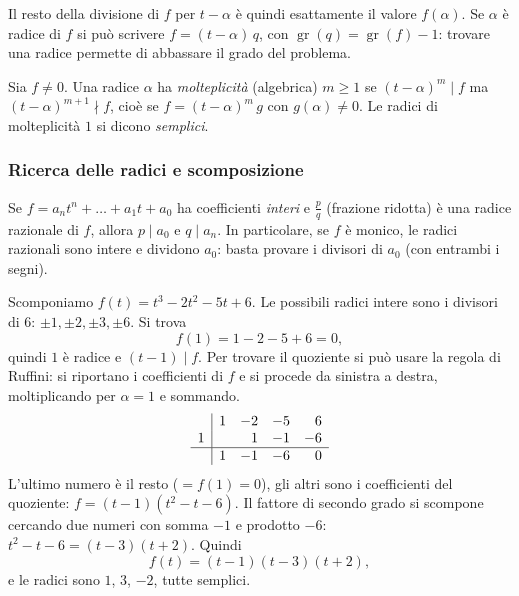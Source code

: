 \documentclass[11pt,a4paper]{article}
\begin{document}
\begin{osservazione}
Il resto della divisione di $f$ per $t - \alpha$ è quindi esattamente il valore
$f(\alpha)$. Se $\alpha$ è radice di $f$ si può scrivere $f = (t - \alpha)\, q$,
con $\operatorname{gr}(q) = \operatorname{gr}(f) - 1$: trovare una radice
permette di abbassare il grado del problema.
\end{osservazione}

\begin{definizione}
Sia $f \neq 0$. Una radice $\alpha$ ha \emph{molteplicità} (algebrica)
$m \geq 1$ se $(t - \alpha)^m \mid f$ ma $(t - \alpha)^{m+1} \nmid f$, cioè se
$f = (t - \alpha)^m\, g$ con $g(\alpha) \neq 0$. Le radici di molteplicità $1$
si dicono \emph{semplici}.
\end{definizione}

\subsubsection{Ricerca delle radici e scomposizione}

\begin{osservazione}
Se $f = a_n t^n + \dots + a_1 t + a_0$ ha coefficienti \emph{interi} e
$\frac{p}{q}$ (frazione ridotta) è una radice razionale di $f$, allora
$p \mid a_0$ e $q \mid a_n$. In particolare, se $f$ è monico, le radici
razionali sono intere e dividono $a_0$: basta provare i divisori di $a_0$
(con entrambi i segni).
\end{osservazione}

\begin{esempio}
Scomponiamo $f(t) = t^3 - 2t^2 - 5t + 6$. Le possibili radici intere sono i
divisori di $6$: $\pm 1, \pm 2, \pm 3, \pm 6$. Si trova
\[
  f(1) = 1 - 2 - 5 + 6 = 0 ,
\]
quindi $1$ è radice e $(t - 1) \mid f$. Per trovare il quoziente si può
usare la regola di Ruffini: si riportano i coefficienti di $f$ e si procede
da sinistra a destra, moltiplicando per $\alpha = 1$ e sommando.
\[
\begin{array}{r|rrrr}
   & 1 & -2 & -5 & 6 \\
 1 &   &  1 & -1 & -6 \\ \hline
   & 1 & -1 & -6 & \;0
\end{array}
\]
L'ultimo numero è il resto ($=f(1)=0$), gli altri sono i coefficienti del
quoziente: $f = (t - 1)(t^2 - t - 6)$. Il fattore di secondo grado si
scompone cercando due numeri con somma $-1$ e prodotto $-6$:
$t^2 - t - 6 = (t - 3)(t + 2)$. Quindi
\[
  f(t) = (t - 1)(t - 3)(t + 2),
\]
e le radici sono $1$, $3$, $-2$, tutte semplici.
\end{esempio}
\end{document}
